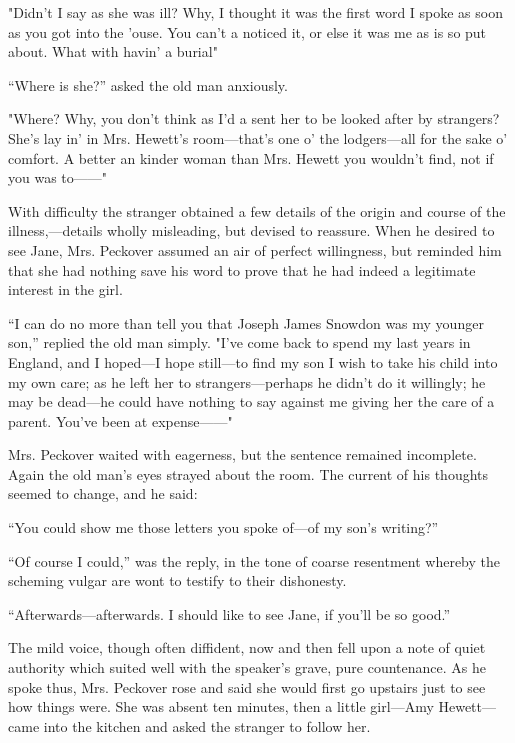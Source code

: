 "Didn't I say as she was ill? Why, I thought it was the first word I
spoke as soon as you got into the 'ouse. You can't a
{\protect\hypertarget{115}{}{}}noticed it, or else it was me as is so
put about. What with havin' a burial"

``Where is she?'' asked the old man anxiously.

"Where? Why, you don't think as I'd a sent her to be looked after by
strangers? She's lay in' in Mrs. Hewett's room---that's one o' the
lodgers---all for the sake o' comfort. A better an kinder woman than
Mrs. Hewett you wouldn't find, not if you was to{{------}}"

With difficulty the stranger obtained a few details of the origin and
course of the illness,---details wholly misleading, but devised to
reassure. When he desired to see Jane, Mrs. Peckover assumed an air of
perfect willingness, but reminded him that she had nothing save his word
to prove that he had indeed a legitimate interest in the girl.

``I can do no more than tell you that Joseph James Snowdon was my
younger son,'' replied the old man simply. "I've come back to spend my
last years in England, and I hoped---I hope still---to find my son
{\protect\hypertarget{116}{}{}}I wish to take his child into my own
care; as he left her to strangers---perhaps he didn't do it willingly;
he may be dead---he could have nothing to say against me giving her the
care of a parent. You've been at expense{{------}}"

Mrs. Peckover waited with eagerness, but the sentence remained
incomplete. Again the old man's eyes strayed about the room. The current
of his thoughts seemed to change, and he said:

``You could show me those letters you spoke of---of my son's writing?''

``Of course I could,'' was the reply, in the tone of coarse resentment
whereby the scheming vulgar are wont to testify to their dishonesty.

``Afterwards---afterwards. I should like to see Jane, if you'll be so
good.''

The mild voice, though often diffident, now and then fell upon a note of
quiet authority which suited well with the speaker's grave, pure
countenance. As he spoke thus, Mrs. Peckover rose and said she would
first go upstairs just to see how things were. She was
{\protect\hypertarget{117}{}{}}absent ten minutes, then a little
girl---Amy Hewett---came into the kitchen and asked the stranger to
follow her.

